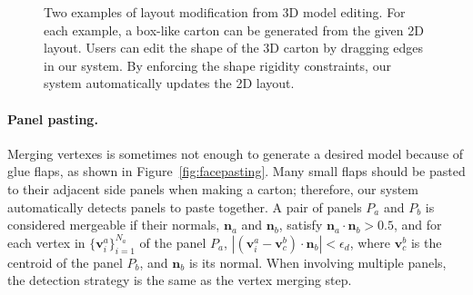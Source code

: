 \begin{figure}
	\centering
	\hspace{4ex}
	\caption{Two examples of layout modification from 3D model editing. For each example, a box-like carton can be generated from the given 2D layout. Users can edit the shape of the 3D carton by dragging edges in our system. By enforcing the shape rigidity constraints, our system automatically updates the 2D layout.}
	\label{fig:editing}
\end{figure}
 
\paragraph{Panel pasting.} Merging vertexes is sometimes not enough to generate a desired model because of glue flaps, as shown in Figure~\ref{fig:facepasting}. 
%
Many small flaps should be pasted to their adjacent side panels when making a carton; therefore, our system automatically detects panels to paste together. 
A pair of panels $P_a$ and $P_b$ is considered mergeable if their normals, $\mathbf{n}_a$ and $\mathbf{n}_b$, satisfy $\mathbf{n}_a \cdot \mathbf{n}_b > 0.5$, and for each vertex in $\{\mathbf{v}^{a}_{i}\}_{i=1}^{N_a}$ of the panel $P_a$,  $|(\mathbf{v}^{a}_{i} - \mathbf{v}_{c}^b) \cdot \mathbf{n}_b| < \epsilon_d$, where $\mathbf{v}_{c}^b$ is the centroid of the panel $P_b$, and $\mathbf{n}_b$ is its normal. When involving multiple panels, the detection strategy is the same as the vertex merging step. 




